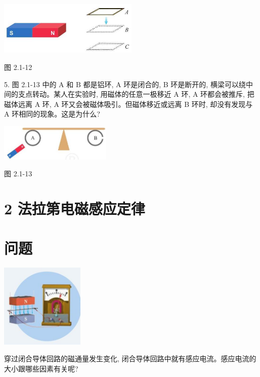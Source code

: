 \documentclass[10pt]{article}
\begin{document}
\begin{center}
\includegraphics[max width=0.5\textwidth]{images/01910e72-c5b7-7ed5-a6d4-fb3a5faefc32_34_284901.jpg}
\end{center}

图 2.1-12

5. 图 2.1-13 中的 \(\mathrm{A}\) 和 \(\mathrm{B}\) 都是铝环, \(\mathrm{A}\) 环是闭合的, B 环是断开的, 横梁可以绕中间的支点转动。某人在实验时, 用磁体的任意一极移近 A 环, A 环都会被推斥, 把磁体远离 A 环, A 环又会被磁体吸引。但磁体移近或远离 B 环时, 却没有发现与 A 环相同的现象。这是为什么?

\begin{center}
\includegraphics[max width=0.4\textwidth]{images/01910e72-c5b7-7ed5-a6d4-fb3a5faefc32_34_865294.jpg}
\end{center}

图 2.1-13

\section*{2 法拉第电磁感应定律}

\section*{问题}

\begin{center}
\includegraphics[max width=0.3\textwidth]{images/01910e72-c5b7-7ed5-a6d4-fb3a5faefc32_35_395030.jpg}
\end{center}

穿过闭合导体回路的磁通量发生变化, 闭合导体回路中就有感应电流。感应电流的大小跟哪些因素有关呢?
\end{document}
